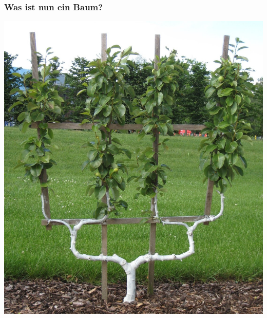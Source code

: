     \begin{frame}[t]
      \frametitle{Was ist nun ein Baum?}

      \begin{center}
        \begin{Huge}
          \includegraphics[height=.8\textheight]{img+txt/binary_tree.jpg}
          \quad
          \par
        \end{Huge}
      \end{center}

    \end{frame}

